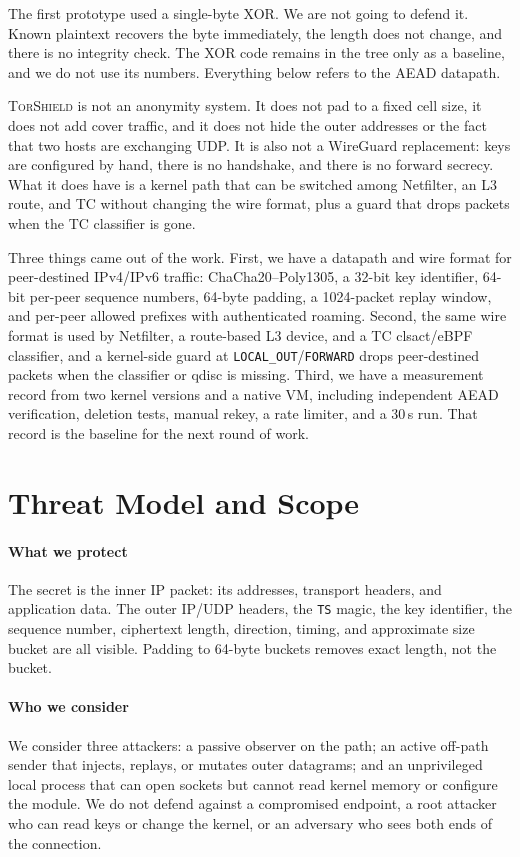 \documentclass[conference]{IEEEtran}
\newcommand{\sys}{\textsc{TorShield}}
\newcommand{\code}[1]{\texttt{#1}}
\begin{document}
The first prototype used a single-byte XOR. We are not going to defend it. Known plaintext recovers the byte immediately, the length does not change, and there is no integrity check. The XOR code remains in the tree only as a baseline, and we do not use its numbers. Everything below refers to the AEAD datapath.

\sys{} is not an anonymity system. It does not pad to a fixed cell size, it does not add cover traffic, and it does not hide the outer addresses or the fact that two hosts are exchanging UDP. It is also not a WireGuard replacement: keys are configured by hand, there is no handshake, and there is no forward secrecy. What it does have is a kernel path that can be switched among Netfilter, an L3 route, and TC without changing the wire format, plus a guard that drops packets when the TC classifier is gone.

Three things came out of the work. First, we have a datapath and wire format for peer-destined IPv4/IPv6 traffic: ChaCha20--Poly1305, a 32-bit key identifier, 64-bit per-peer sequence numbers, 64-byte padding, a 1024-packet replay window, and per-peer allowed prefixes with authenticated roaming. Second, the same wire format is used by Netfilter, a route-based L3 device, and a TC clsact/eBPF classifier, and a kernel-side guard at \code{LOCAL\_OUT}/\code{FORWARD} drops peer-destined packets when the classifier or qdisc is missing. Third, we have a measurement record from two kernel versions and a native VM, including independent AEAD verification, deletion tests, manual rekey, a rate limiter, and a 30\,s run. That record is the baseline for the next round of work.

\section{Threat Model and Scope}

\paragraph{What we protect}
The secret is the inner IP packet: its addresses, transport headers, and application data. The outer IP/UDP headers, the \code{TS} magic, the key identifier, the sequence number, ciphertext length, direction, timing, and approximate size bucket are all visible. Padding to 64-byte buckets removes exact length, not the bucket.

\paragraph{Who we consider}
We consider three attackers: a passive observer on the path; an active off-path sender that injects, replays, or mutates outer datagrams; and an unprivileged local process that can open sockets but cannot read kernel memory or configure the module. We do not defend against a compromised endpoint, a root attacker who can read keys or change the kernel, or an adversary who sees both ends of the connection.
\end{document}
